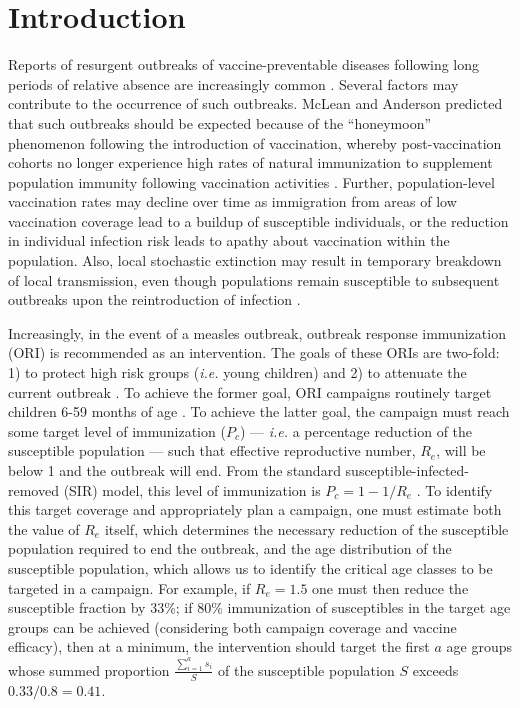\section{Introduction}\label{introduction}

Reports of resurgent outbreaks of vaccine-preventable diseases following long periods of relative absence are  increasingly common \cite{Hersh_1991, Cherry_2012, Celentano_2005, Shibeshi_2014}. Several factors may contribute to the occurrence of such outbreaks. McLean and Anderson \cite{McLean_1988} predicted that such outbreaks should be expected because of the ``honeymoon'' phenomenon following the introduction of vaccination, whereby post-vaccination cohorts no longer experience high rates of natural immunization to supplement population immunity following vaccination activities \cite{Jansen_2003}. Further, population-level vaccination rates may decline over time as immigration from areas of low vaccination coverage lead to a buildup of susceptible individuals, or the reduction in individual infection risk \cite{Omer_2009} leads to apathy about vaccination within the population. Also, local stochastic extinction may result in temporary breakdown of local transmission, even though populations remain susceptible to subsequent outbreaks upon the reintroduction of infection \cite{Ferrari_2008}.

Increasingly, in the event of a measles outbreak, outbreak response immunization (ORI) is recommended as an intervention. The goals of these ORIs are two-fold: 1) to protect high risk groups (\emph{i.e.} young children) and 2) to attenuate the current outbreak \cite{Cairns_2011,Grais_2011}. To achieve the former goal, ORI campaigns routinely target children 6-59 months of age \cite{Cairns_2011}. To achieve the latter goal, the campaign must reach some target level of immunization (\(P_c\)) --- \emph{i.e.} a percentage reduction of the susceptible population --- such that effective reproductive number, \(R_e\), will be below 1 and the outbreak will end. From the standard susceptible-infected-removed (SIR) model, this level of immunization is \(P_c = 1-1/R_e\) \cite{Anderson_1981}. To identify this target coverage and appropriately plan a campaign, one must estimate both the value of \(R_e\) itself, which determines the necessary reduction of the susceptible population required to end the outbreak, and the age distribution of the susceptible population, which allows us to identify the critical age classes to be targeted in a campaign. For example, if \(R_e=1.5\) one must then reduce the susceptible fraction by 33\%; if 80\% immunization of susceptibles in the target age groups can be achieved (considering both campaign coverage and vaccine efficacy), then at a minimum, the intervention should target the first $a$ age groups whose summed proportion $\frac{\sum_{i=1}^a s_i}{S}$ of the susceptible population $S$ exceeds $0.33/0.8 = 0.41$.

